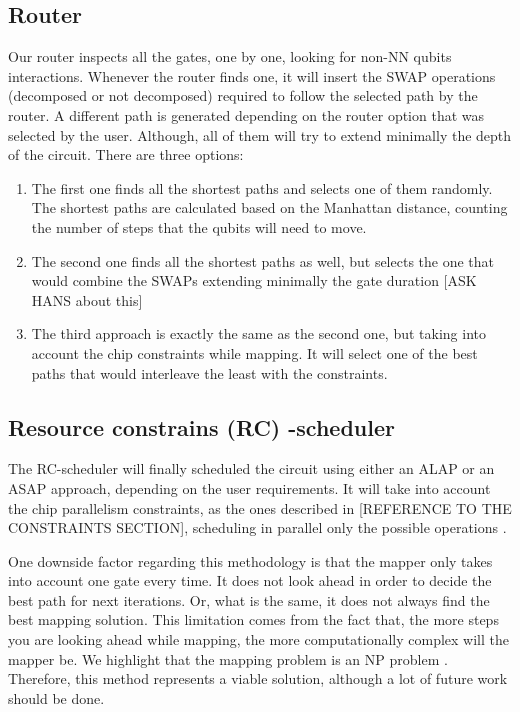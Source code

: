 \subsection*{Router}
\label{sec:orga5dbe88}

Our router inspects all the gates, one by one, looking for non-NN qubits interactions.
Whenever the router finds one, it will insert the SWAP operations (decomposed or not decomposed) required to follow the selected path by the router.
A different path is generated depending on the router option that was selected by the user.
Although, all of them will try to extend minimally the depth of the circuit.
There are three options:

\begin{enumerate}
\item The first one finds all the shortest paths and selects one of them randomly. The shortest paths are calculated based on the Manhattan distance, counting the number of steps that the qubits will need to move.
\item The second one finds all the shortest paths as well, but selects the one that would combine the SWAPs extending minimally the gate duration [ASK HANS about this]
\item The third approach is exactly the same as the second one, but taking into account the chip constraints while mapping. It will select one of the best paths that would interleave the least with the constraints.
\end{enumerate}


\subsection*{Resource constrains (RC) -scheduler}
\label{sec:org90635fc}

The RC-scheduler will finally scheduled the circuit using either an ALAP or an ASAP approach, depending on the user requirements.
It will take into account the chip parallelism constraints, as the ones described in [REFERENCE TO THE CONSTRAINTS SECTION], scheduling in parallel only the possible operations
.

One downside factor regarding this methodology is that the mapper only takes into account one gate every time.
It does not look ahead in order to decide the best path for next iterations.
Or, what is the same, it does not always find the best mapping solution.
This limitation comes from the fact that, the more steps you are looking ahead while mapping, the more computationally complex will the mapper be.
We highlight that the mapping problem is an NP problem \cite{Siraichi_2018}.
Therefore, this method represents a viable solution, although a lot of future work should be done.

